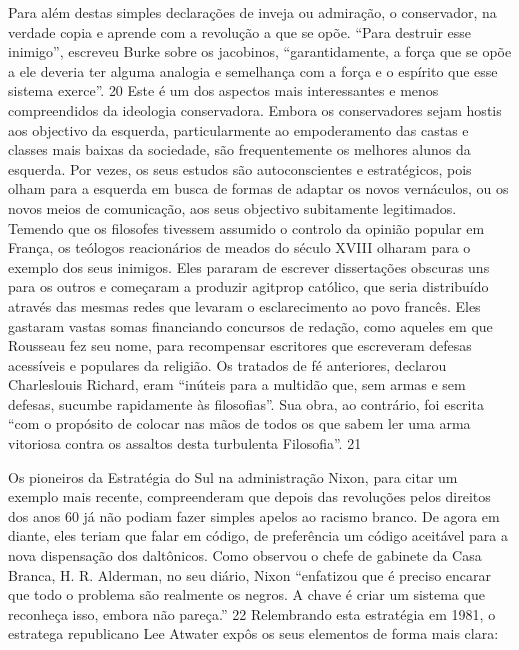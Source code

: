  
\par
 
Para além destas simples declarações de inveja ou admiração, o conservador, na verdade copia e aprende com a revolução a que se opõe. “Para destruir esse inimigo”, escreveu Burke sobre os jacobinos, “garantidamente, a força que se opõe a ele deveria ter alguma analogia e semelhança com a força e o espírito que esse sistema exerce”.
 {\color{blue} 20}  
Este é um dos aspectos mais interessantes e menos compreendidos da ideologia conservadora. Embora os conservadores sejam hostis aos objectivo da esquerda, particularmente ao empoderamento das castas e classes mais baixas da sociedade, são frequentemente os melhores alunos da esquerda. Por vezes, os seus estudos são autoconscientes e estratégicos, pois olham para a esquerda em busca de formas de adaptar os novos vernáculos, ou os novos meios de comunicação, aos seus objectivo subitamente legitimados. Temendo que os filosofes tivessem assumido o controlo da opinião popular em França, os teólogos reacionários de meados do século XVIII olharam para o exemplo dos seus inimigos. Eles pararam de escrever dissertações obscuras uns para os outros e começaram a produzir agitprop católico, que seria distribuído através das mesmas redes que levaram o esclarecimento ao povo francês. Eles gastaram vastas somas financiando concursos de redação, como aqueles em que Rousseau fez seu nome, para recompensar escritores que escreveram defesas acessíveis e populares da religião. Os tratados de fé anteriores, declarou Charleslouis Richard, eram “inúteis para a multidão que, sem armas e sem defesas, sucumbe rapidamente às filosofias”. Sua obra, ao contrário, foi escrita “com o propósito de colocar nas mãos de todos os que sabem ler uma arma vitoriosa contra os assaltos desta turbulenta Filosofia”.
 {\color{blue} 21}  

 
\par
 
Os pioneiros da Estratégia do Sul na administração Nixon, para citar um exemplo mais recente, compreenderam que depois das revoluções pelos direitos dos anos 60 já não podiam fazer simples apelos ao racismo branco. De agora em diante, eles teriam que falar em código, de preferência um código aceitável para a nova dispensação dos daltônicos. Como observou o chefe de gabinete da Casa Branca, H. R. Alderman, no seu diário, Nixon “enfatizou que é preciso encarar que todo o problema são realmente os negros. A chave é criar um sistema que reconheça isso, embora não pareça.”
 {\color{blue} 22}  
Relembrando esta estratégia em 1981, o estratega republicano Lee Atwater expôs os seus elementos de forma mais clara:
 
